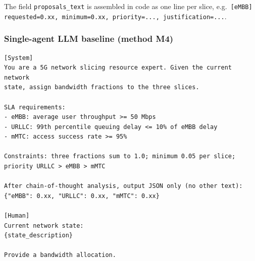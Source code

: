 \noindent
The field \texttt{proposals\_text} is assembled in code as one line per
slice, e.g.\
\texttt{[eMBB] requested=0.xx, minimum=0.xx, priority=..., justification=...}.

\subsubsection*{Single-agent LLM baseline (method M4)}

\begin{lstlisting}[basicstyle=\footnotesize\ttfamily, breaklines=true, columns=fullflexible, frame=single]
[System]
You are a 5G network slicing resource expert. Given the current network
state, assign bandwidth fractions to the three slices.

SLA requirements:
- eMBB: average user throughput >= 50 Mbps
- URLLC: 99th percentile queuing delay <= 10% of eMBB delay
- mMTC: access success rate >= 95%

Constraints: three fractions sum to 1.0; minimum 0.05 per slice;
priority URLLC > eMBB > mMTC

After chain-of-thought analysis, output JSON only (no other text):
{"eMBB": 0.xx, "URLLC": 0.xx, "mMTC": 0.xx}

[Human]
Current network state:
{state_description}

Provide a bandwidth allocation.
\end{lstlisting}
